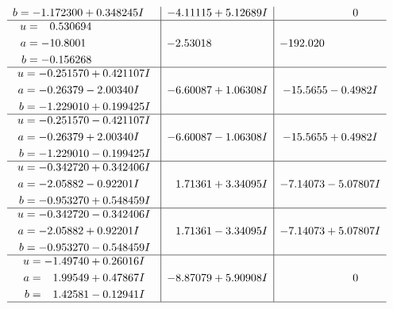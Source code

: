 \documentclass[1p]{elsarticle_modified}
\theoremstyle{definition}
\begin{document}
$$\begin{array}{c|c|c}
\begin{aligned}
b &= -1.172300 + 0.348245 I\end{aligned}
 & -4.11115 + 5.12689 I & \phantom{-0.000000 } 0 \\ \hline\begin{aligned}
u &= \phantom{-}0.530694\phantom{ +0.000000I} \\
a &= -10.8001\phantom{ +0.000000I} \\
b &= -0.156268\phantom{ +0.000000I}\end{aligned}
 & -2.53018\phantom{ +0.000000I} & -192.020\phantom{ +0.000000I} \\ \hline\begin{aligned}
u &= -0.251570 + 0.421107 I \\
a &= -0.26379 - 2.00340 I \\
b &= -1.229010 + 0.199425 I\end{aligned}
 & -6.60087 + 1.06308 I & -15.5655 - 0.4982 I \\ \hline\begin{aligned}
u &= -0.251570 - 0.421107 I \\
a &= -0.26379 + 2.00340 I \\
b &= -1.229010 - 0.199425 I\end{aligned}
 & -6.60087 - 1.06308 I & -15.5655 + 0.4982 I \\ \hline\begin{aligned}
u &= -0.342720 + 0.342406 I \\
a &= -2.05882 - 0.92201 I \\
b &= -0.953270 + 0.548459 I\end{aligned}
 & \phantom{-}1.71361 + 3.34095 I & -7.14073 - 5.07807 I \\ \hline\begin{aligned}
u &= -0.342720 - 0.342406 I \\
a &= -2.05882 + 0.92201 I \\
b &= -0.953270 - 0.548459 I\end{aligned}
 & \phantom{-}1.71361 - 3.34095 I & -7.14073 + 5.07807 I \\ \hline\begin{aligned}
u &= -1.49740 + 0.26016 I \\
a &= \phantom{-}1.99549 + 0.47867 I \\
b &= \phantom{-}1.42581 - 0.12941 I\end{aligned}
 & -8.87079 + 5.90908 I & \phantom{-0.000000 } 0\\
 \hline 
 \end{array}$$\newpage$$\begin{array}{c|c|c}  

\end{array}$$
\end{document}
